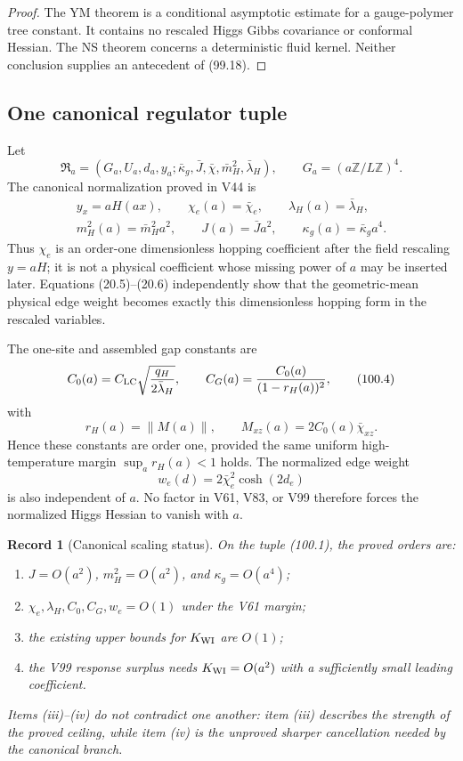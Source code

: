 \documentclass[11pt]{article}
\newtheorem{record}[theorem]{Record}
\theoremstyle{remark}
\begin{document}
\begin{proof}
The YM theorem is a conditional asymptotic estimate for a gauge-polymer
tree constant.  It contains no rescaled Higgs Gibbs covariance or
conformal Hessian.  The NS theorem concerns a deterministic fluid
kernel.  Neither conclusion supplies an antecedent of (99.18).
\end{proof}

\subsection{One canonical regulator tuple}

Let
\[
 \mathfrak R_a=(G_a,U_a,d_a,y_a;
 \bar\kappa_g,\bar J,\bar\chi,\bar m_H^2,
 \bar\lambda_H),
 \qquad G_a=(a\mathbb Z/L\mathbb Z)^4.              \tag{100.1}
\]
The canonical normalization proved in V44 is
\[
\begin{gathered}
 y_x=aH(ax),
 \qquad \chi_e(a)=\bar\chi_e,
 \qquad \lambda_H(a)=\bar\lambda_H,                \tag{100.2}\\
 m_H^2(a)=\bar m_H^2a^2,
 \qquad J(a)=\bar Ja^2,
 \qquad \kappa_g(a)=\bar\kappa_ga^4.               \tag{100.3}
\end{gathered}
\]
Thus \(\chi_e\) is an order-one dimensionless hopping coefficient
after the field rescaling \(y=aH\); it is not a physical coefficient
whose missing power of \(a\) may be inserted later.  Equations
(20.5)--(20.6) independently show that the geometric-mean physical
edge weight becomes exactly this dimensionless hopping form in the
rescaled variables.

The one-site and assembled gap constants are
\[
 C_0(a)=C_{\rm LC}
 \sqrt{\frac{q_H}{2\bar\lambda_H}},
 \qquad
 C_G(a)=\frac{C_0(a)}{(1-r_H(a))^2},                \tag{100.4}
\]
with
\[
 r_H(a)=\|M(a)\|,
 \qquad M_{xz}(a)=2C_0(a)\bar\chi_{xz}.             \tag{100.5}
\]
Hence these constants are order one, provided the same uniform
high-temperature margin \(\sup_ar_H(a)<1\) holds.  The normalized edge
weight
\[
 w_e(d)=2\bar\chi_e^2\cosh(2d_e)                   \tag{100.6}
\]
is also independent of \(a\).  No factor in V61, V83, or V99 therefore
forces the normalized Higgs Hessian to vanish with \(a\).

\begin{record}[Canonical scaling status]
\label{rec:v17v100-ledger}
On the tuple (100.1), the proved orders are:
\begin{enumerate}[label=\textup{(\roman*)},leftmargin=3.4em]
\item \(J=O(a^2)\), \(m_H^2=O(a^2)\), and
      \(\kappa_g=O(a^4)\);
\item \(\chi_e,\lambda_H,C_0,C_G,w_e=O(1)\) under the V61 margin;
\item the existing upper bounds for \(K_{\rm WI}\) are \(O(1)\);
\item the V99 response surplus needs
      \(K_{\rm WI}=O(a^2)\) with a sufficiently small leading
      coefficient.
\end{enumerate}
Items (iii)--(iv) do not contradict one another: item (iii) describes
the strength of the proved ceiling, while item (iv) is the unproved
sharper cancellation needed by the canonical branch.
\end{record}
\end{document}
